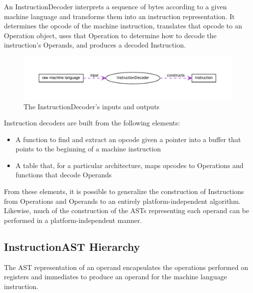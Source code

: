 An InstructionDecoder interprets a sequence of bytes according to a given
machine language and transforms them into an instruction representation. It
determines the opcode of the machine instruction, translates that opcode to an
Operation object, uses that Operation to determine how to decode the
instruction's Operands, and produces a decoded Instruction.

\begin{figure}
    \centering
    \includegraphics[scale=.8]{fig/decoder_use}
\caption{The InstructionDecoder's inputs and outputs}
\label{fig:decoder-use}
\end{figure}
 
Instruction decoders are built from the following elements:

\begin{itemize}
\item A function to find and extract an opcode given a pointer into a buffer that points to the beginning of a machine instruction
\item A table that, for a particular architecture, maps opcodes to Operations and functions that decode Operands
\end{itemize}

From these elements, it is possible to generalize the construction of
Instructions from Operations and Operands to an entirely platform-\/independent
algorithm. Likewise, much of the construction of the ASTs representing each
operand can be performed in a platform-\/independent manner. 

\subsection{InstructionAST Hierarchy}
\label{subsec:hierarchy}

The AST representation of an operand encapsulates the operations performed on
registers and immediates to produce an operand for the machine language
instruction.

